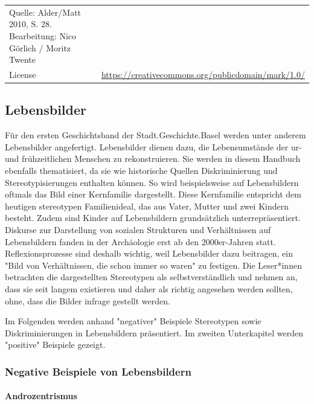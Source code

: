 \documentclass[
  letterpaper,
  DIV=11,
  numbers=noendperiod,
  landscape,
  a4paper,
  geometry:margin=1in]{scrartcl}
\let\oldparagraph\paragraph
\renewcommand{\paragraph}[1]{\oldparagraph{#1}\mbox{}}
\begin{document}
\begin{longtable}[]{@{}
  >{\raggedright\arraybackslash}p{}
  >{\raggedright\arraybackslash}p{}@{}}
Quelle: Alder/Matt 2010, S. 28. Bearbeitung: Nico Görlich / Moritz
Twente \\
License & \url{https://creativecommons.org/publicdomain/mark/1.0/} \\
\end{longtable}

\subsection{Lebensbilder}\label{lebensbilder}

Für den ersten Geschichtsband der Stadt.Geschichte.Basel werden unter
anderem Lebensbilder angefertigt. Lebensbilder dienen dazu, die
Lebensumstände der ur- und frühzeitlichen Menschen zu rekonstruieren.
Sie werden in diesem Handbuch ebenfalls thematisiert, da sie wie
historische Quellen Diskriminierung und Stereotypisierungen enthalten
können. So wird beispielsweise auf Lebensbildern oftmals das Bild einer
Kernfamilie dargestellt. Diese Kernfamilie entspricht dem heutigen
stereotypen Familienideal, das aus Vater, Mutter und zwei Kindern
besteht. Zudem sind Kinder auf Lebensbildern grundsätzlich
unterrepräsentiert. Diskurse zur Darstellung von sozialen Strukturen und
Verhältnissen auf Lebensbildern fanden in der Archäologie erst ab den
2000er-Jahren statt. Reflexionsprozesse sind deshalb wichtig, weil
Lebensbilder dazu beitragen, ein "Bild von Verhältnissen, die schon
immer so waren" zu festigen. Die Leser*innen betrachten die
dargestellten Stereotypen als selbstverständlich und nehmen an, dass sie
seit langem existieren und daher als richtig angesehen werden sollten,
ohne, dass die Bilder infrage gestellt werden.~~

Im Folgenden werden anhand "negativer" Beispiele Stereotypen sowie
Diskriminierungen in Lebensbildern präsentiert. Im zweiten Unterkapitel
werden "positive" Beispiele gezeigt.

\subsubsection{Negative Beispiele von
Lebensbildern}\label{negative-beispiele-von-lebensbildern}

\paragraph{Androzentrismus}\label{androzentrismus}
\end{document}
